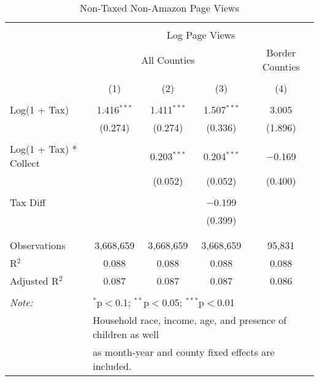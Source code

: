 
\begin{table}[!htbp] \centering 
  \caption{Non-Taxed Non-Amazon Page Views} 
  \label{} 
\begin{tabular}{@{\extracolsep{5pt}}lcccc} 
\\[-1.8ex]\hline 
\hline \\[-1.8ex] 
 & \multicolumn{4}{c}{Log Page Views} \\ 
\cline{2-5} 
 & \multicolumn{3}{c}{All Counties} & Border Counties \\ 
\\[-1.8ex] & (1) & (2) & (3) & (4)\\ 
\hline \\[-1.8ex] 
 Log(1 + Tax) & 1.416$^{***}$ & 1.411$^{***}$ & 1.507$^{***}$ & 3.005 \\ 
  & (0.274) & (0.274) & (0.336) & (1.896) \\ 
  & & & & \\ 
 Log(1 + Tax) * Collect &  & 0.203$^{***}$ & 0.204$^{***}$ & $-$0.169 \\ 
  &  & (0.052) & (0.052) & (0.400) \\ 
  & & & & \\ 
 Tax Diff &  &  & $-$0.199 &  \\ 
  &  &  & (0.399) &  \\ 
  & & & & \\ 
\hline \\[-1.8ex] 
Observations & 3,668,659 & 3,668,659 & 3,668,659 & 95,831 \\ 
R$^{2}$ & 0.088 & 0.088 & 0.088 & 0.088 \\ 
Adjusted R$^{2}$ & 0.087 & 0.087 & 0.087 & 0.086 \\ 
\hline 
\hline \\[-1.8ex] 
\textit{Note:}  & \multicolumn{4}{l}{$^{*}$p$<$0.1; $^{**}$p$<$0.05; $^{***}$p$<$0.01} \\ 
 & \multicolumn{4}{l}{Household race, income, age, and presence of children as well} \\ 
 & \multicolumn{4}{l}{as month-year and county fixed effects are included.} \\ 
\end{tabular} 
\end{table} 
